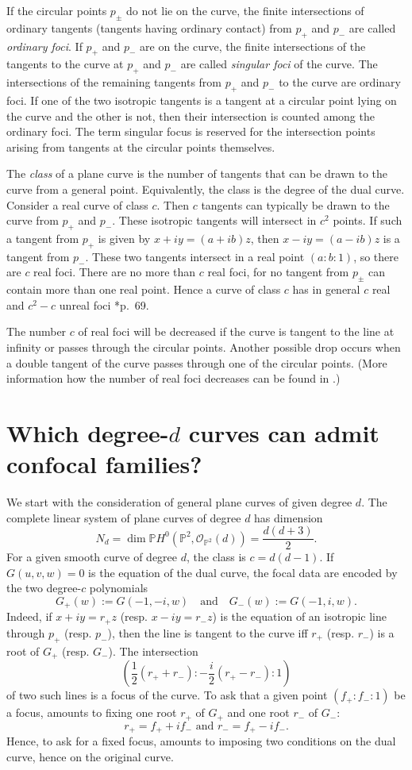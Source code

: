 \documentclass[11pt]{amsart}
\theoremstyle{definition}
\theoremstyle{remark}
\begin{document}
If the circular points $p_\pm$ do not lie on the curve, the finite intersections of ordinary tangents (tangents having ordinary contact) from $p_+$ and $p_-$ are called \emph{ordinary foci}. If $p_+$ and $p_-$ are on the curve, the finite intersections of the tangents to the curve at $p_+$ and $p_-$ are called \emph{singular foci} of the curve. The intersections of the remaining tangents from $p_+$ and $p_-$ to the curve are ordinary foci. If one of the two isotropic tangents is a tangent at a circular point lying on the curve and the other is not, then their intersection is counted among the ordinary foci.  The term singular focus is reserved for the intersection points arising from tangents at the circular points themselves.

\medskip
The \emph{class} of a plane curve is the number of tangents that can be drawn to the curve from a general point. Equivalently, the class is the degree of the dual curve. Consider a real curve of class $c$. Then $c$ tangents can typically be drawn to the curve from $p_+$ and $p_-$. These isotropic tangents will intersect in $c^2$ points. If such a tangent from $p_+$ is given by $x+iy=(a+ib)z$, then $x-iy=(a-ib)z$ is a tangent from $p_-$. These two tangents intersect in a real point $(a:b:1)$, so there are $c$ real foci. There are no more than $c$ real foci, for no tangent from $p_\pm$ can contain more than one real point. Hence a curve of class $c$ has in general $c$ real and $c^2-c$ unreal foci \cite{Hi}*{p.~69}. 

The number $c$ of real foci will be decreased if the curve is tangent  to the line at infinity or passes through the circular points.  Another possible drop occurs when a double tangent of the curve passes through one of the circular points. (More information how the number of real foci decreases can be found in  \cite{Ri}.)  

\section{Which degree-$d$ curves can admit confocal families?}
We start with the consideration of general plane curves of given degree $d$. 
The complete linear system of plane curves of degree $d$ has dimension
\[
N_d=\dim \mathbb P H^0(\mathbb P^2,\mathcal O_{\mathbb P^2}(d))=\frac{d(d+3)}{2}.
\]
For a given smooth curve of degree $d$, the class is $c=d(d-1)$. 
If $G(u,v,w)=0$ is the equation of the dual curve,  the focal data are encoded by the two degree-$c$ polynomials
\[
G_+(w):=G(-1,-i,w) \quad \text{and} \quad G_-(w):=G(-1,i,w).
\]
Indeed, if $x+iy=r_+z$ (resp.  $x-iy=r_-z$) is the equation of an isotropic line through $p_+$ (resp. $p_-$), then the line is tangent to the curve iff $r_+$ (resp. $r_-$) is a root of $G_+$ (resp. $G_-$).
The intersection
\[\left(\frac{1}2 (r_++r_-):-\frac{i}2(r_+-r_-):1\right)
\]
of two such lines is a focus of the curve. To ask that a given point $(f_+:f_-:1)$ be a focus, amounts to fixing one root $r_+$ of $G_+$ and one root $r_-$ of $G_-$:
\[r_+=f_+ +if_- \text{ and } r_-=f_+ - if_-.\]
Hence, to ask for a fixed focus, amounts to imposing two conditions on the dual curve, hence on the original curve.
\end{document}
